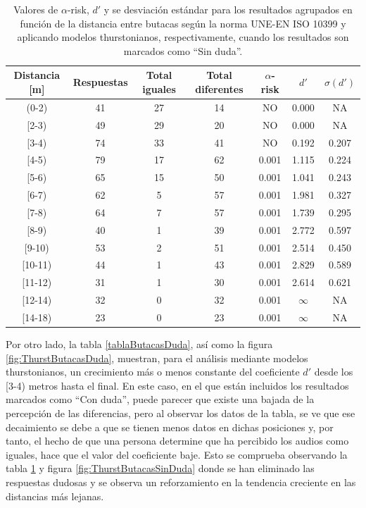 \documentclass[11pt,a4paper]{book}
\begin{document}
		    \begin{table}[H]
			\begin{center}
			\begin{scriptsize}
			\begin{tabular}{| c | c | c | c || c | c | c |}
			    \hline
				\textbf{Distancia [m]}&\textbf{Respuestas}&\textbf{Total iguales}&\textbf{Total diferentes}&\textbf{$\alpha$-risk}&\textbf{$d'$}&\textbf{$\sigma (d')$}\\ \hline
                (0-2)&41&27&14&NO&0.000&NA\\ \hline
                [2-3)&49&29&20&NO&0.000&NA\\ \hline
                [3-4)&74&33&41&NO&0.192&0.207\\ \hline
                [4-5)&79&17&62&0.001&1.115&0.224\\ \hline
                [5-6)&65&15&50&0.001&1.041&0.243\\ \hline
                [6-7)&62&5&57&0.001&1.981&0.327\\ \hline
                [7-8)&64&7&57&0.001&1.739&0.295\\ \hline
                [8-9)&40&1&39&0.001&2.772&0.597\\ \hline
                [9-10)&53&2&51&0.001&2.514&0.450\\ \hline
                [10-11)&44&1&43&0.001&2.829&0.589\\ \hline
                [11-12)&31&1&30&0.001&2.614&0.621\\ \hline
                [12-14)&32&0&32&0.001&$\infty$&NA\\ \hline
                [14-18)&23&0&23&0.001&$\infty$&NA\\ \hline
			\end{tabular}
			\caption{Valores de $\alpha$-risk, $d'$ y se desviación estándar para los resultados agrupados en función de la distancia entre butacas según la norma UNE-EN ISO 10399 y aplicando modelos thurstonianos, respectivamente, cuando los resultados son marcados como ``Sin duda''.}
			\label{tablaButacasSinDuda}
			\end{scriptsize}
			\end{center}	
		    \end{table}
            
            
            Por otro lado, la tabla \ref{tablaButacasDuda}, así como la figura \ref{fig:ThurstButacasDuda}, muestran, para el análisis mediante modelos thurstonianos, un crecimiento más o menos constante del coeficiente $d'$ desde los [3-4) metros hasta el final. En este caso, en el que están incluidos los resultados marcados como ``Con duda'', puede parecer que existe una bajada de la percepción de las diferencias, pero al observar los datos de la tabla, se ve que ese decaimiento se debe a que se tienen menos datos en dichas posiciones y, por tanto, el hecho de que una persona determine que ha percibido los audios como iguales, hace que el valor del coeficiente baje. Esto se comprueba observando la tabla \ref{tablaButacasSinDuda} y figura \ref{fig:ThurstButacasSinDuda} donde se han eliminado las respuestas dudosas y se observa un reforzamiento en la tendencia creciente en las distancias más lejanas.
		    
\end{document}
